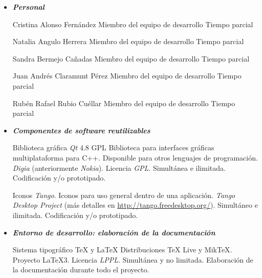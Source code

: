

\begin{itemize}
	\item {\itshape \bfseries Personal} \\ \medskip

		{Cristina Alonso Fernández}	%
		{Miembro del equipo de desarrollo}	%
		{}	%
		{Tiempo parcial}	%
		{}	%

		{Natalia Angulo Herrera}
		{Miembro del equipo de desarrollo}
		{}
		{Tiempo parcial}
		{}

		{Sandra Bermejo Cañadas}
		{Miembro del equipo de desarrollo}
		{}
		{Tiempo parcial}
		{}

		{Juan Andrés Claramunt Pérez}
		{Miembro del equipo de desarrollo}
		{}
		{Tiempo parcial}
		{}

		{Rubén Rafael Rubio Cuéllar}
		{Miembro del equipo de desarrollo}
		{}
		{Tiempo parcial}
		{}

	\bigskip
	\item {\itshape \bfseries Componentes de software reutilizables} \\ \medskip

		{Biblioteca gráfica \textit{Qt} 4.8 GPL}
		{Biblioteca para interfaces gráficas multiplataforma para C++. Disponible para otros lenguajes de programación.}
		{\textit{Digia} (anteriormente \textit{Nokia}). Licencia \textit{GPL}.}
		{Simultánea e ilimitada.}
		{Codificación y/o prototipado.}


		{Iconos \textit{Tango}.}
		{Iconos para uso general dentro de una aplicación.}
		{\textit{Tango Desktop Project} (más detalles en \url{http://tango.freedesktop.org/}).}
		{Simultáneo e ilimitada.}
		{Codificación y/o prototipado.}

	\bigskip
	\item {\itshape \bfseries Entorno de desarrollo: elaboración  de la documentación} \\ \medskip

		{Sistema tipográfico {\rmfamily \TeX{}} y {\rmfamily\LaTeX{}}}
		{Distribuciones {\rmfamily\TeX{} Live} y {\rmfamily Mik\TeX{}}.}
		{Proyecto {\rmfamily\LaTeX{}3}. Licencia \textit{LPPL}.}
		{Simultánea y no limitada.}
		{Elaboración de la documentación durante todo el proyecto.}


\end{itemize}
